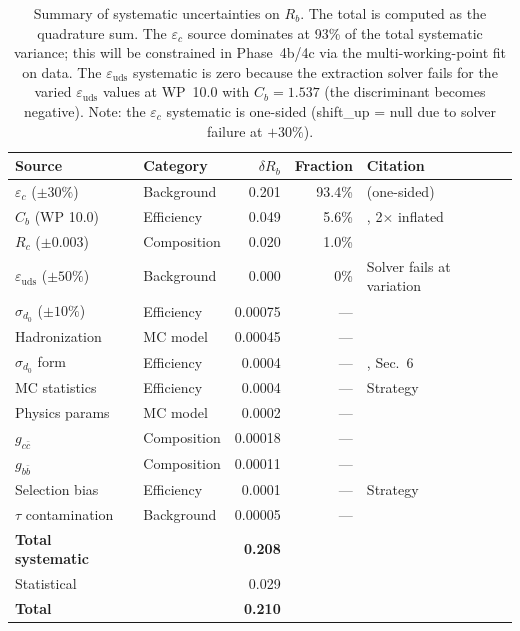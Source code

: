 \documentclass[11pt,a4paper]{article}
\begin{document}
\begin{table}[htbp]
\centering
\caption{Summary of systematic uncertainties on $R_b$. The total is computed as
the quadrature sum. The $\varepsilon_c$ source dominates at 93\% of
the total systematic variance; this will be constrained in Phase~4b/4c via the
multi-working-point fit on data. The $\varepsilon_\mathrm{uds}$ systematic is zero
because the extraction solver fails for the varied $\varepsilon_\mathrm{uds}$ values at
WP~10.0 with $C_b = 1.537$ (the discriminant becomes negative). Note: the
$\varepsilon_c$ systematic is one-sided (shift\_up = null due to solver failure at $+30\%$).}
\label{tab:syst_summary_rb}
\small
\begin{tabular}{llrrl}
\toprule
Source & Category & $\delta R_b$ & Fraction & Citation \\
\midrule
$\varepsilon_c$ ($\pm 30\%$) & Background & 0.201 & 93.4\% & \cite{LEP:HF:2001} (one-sided) \\
$C_b$ (WP 10.0) & Efficiency & 0.049 & 5.6\% & \cite{ALEPH:Rb:1996}, 2$\times$ inflated \\
$R_c$ ($\pm 0.003$) & Composition & 0.020 & 1.0\% & \cite{LEP:EWWG:2005} \\
$\varepsilon_\mathrm{uds}$ ($\pm 50\%$) & Background & 0.000 & 0\% & Solver fails at variation \\
$\sigma_{d_0}$ ($\pm 10\%$) & Efficiency & 0.00075 & --- & \cite{ALEPH:Rb:1996} \\
Hadronization & MC model & 0.00045 & --- & \cite{ALEPH:Rb:1996} \\
$\sigma_{d_0}$ form & Efficiency & 0.0004 & --- & \cite{ALEPH:Rb:1996}, Sec.~6 \\
MC statistics & Efficiency & 0.0004 & --- & Strategy \\
Physics params & MC model & 0.0002 & --- & \cite{PDG:2024} \\
$g_{c\bar{c}}$ & Composition & 0.00018 & --- & \cite{LEP:gcc} \\
$g_{b\bar{b}}$ & Composition & 0.00011 & --- & \cite{LEP:HF:2001} \\
Selection bias & Efficiency & 0.0001 & --- & Strategy \\
$\tau$ contamination & Background & 0.00005 & --- & \cite{ALEPH:sigma_had} \\
\midrule
\textbf{Total systematic} & & \textbf{0.208} & & \\
Statistical & & 0.029 & & \\
\midrule
\textbf{Total} & & \textbf{0.210} & & \\
\bottomrule
\end{tabular}
\end{table}
\end{document}
